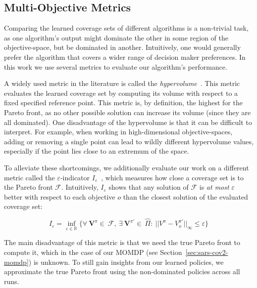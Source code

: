\documentclass{article}
\renewcommand{\cite}[1]{\citep{#1}}
\newcommand{\mdpvaluefunction}{V}
\newcommand{\momdpvaluefunction}{\mathbf{V}}
\begin{document}
\subsection{Multi-Objective Metrics}
Comparing the learned coverage sets of different algorithms is a non-trivial task, as one algorithm's output might dominate the other in some region of the objective-space, but be dominated in another. Intuitively, one would generally prefer the algorithm that covers a wider range of decision maker preferences. In this work we use several metrics to evaluate our algorithm's performance.

A widely used metric in the literature is called the \emph{hypervolume}~\cite{zitzler2003}. This metric evaluates the learned coverage set by computing its volume with respect to a fixed specified reference point. This metric is, by definition, the highest for the Pareto front, as no other possible solution can increase its volume (since they are all dominated). One disadvantage of the hypervolume is that it can be difficult to interpret. For example, when working in high-dimensional objective-spaces, adding or removing a single point can lead to wildly different hypervolume values, especially if the point lies close to an extremum of the space.

To alleviate these shortcomings, we additionally evaluate our work on a different metric called the $\varepsilon$-indicator $I_\varepsilon$~\cite{zitzler2003}, which measures how close a coverage set is to the Pareto front $\mathcal{F}$. Intuitively, $I_\varepsilon$ shows that any solution of $\mathcal{F}$ is \emph{at most} $\varepsilon$ better with respect to each objective $o$ than the closest solution of the evaluated coverage set:

\begin{equation}
\label{eq:epsilon-metric}
    I_{\varepsilon} = 
    \inf_{\varepsilon\in\mathbb{R}} 
    \{ 
    \forall\ \momdpvaluefunction^\pi\!{\in}\ \mathcal{F}, ~
    \exists\ \momdpvaluefunction^{\pi'}\!{\in}\ \hat{\Pi} :\ 
    || \mdpvaluefunction^\pi - \mdpvaluefunction_o^{\pi'} ||_{\infty} \le \varepsilon
    \}
\end{equation}

The main disadvantage of this metric is that we need the true Pareto front to compute it, which in the case of our MOMDP (see Section~\ref{sec:sars-cov2-momdp}) is unknown. To still gain insights from our learned policies, we approximate the true Pareto front using the non-dominated policies across all runs.
\end{document}
